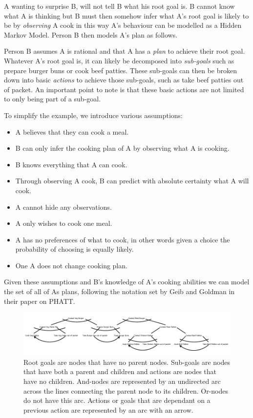\documentclass[parskip]{cs4rep}
\begin{document}
A wanting to surprise B, will not tell B what his root goal is. B cannot know what A is thinking but B must then somehow infer what A's root goal is likely to be by \textit{observing} A cook in this way A's behaviour can be modelled as a Hidden Markov Model. Person B then models A's plan as follows. 

Person B assumes A is rational and that A has a \textit{plan} to achieve their root goal. Whatever A's root goal is, it can likely be decomposed into \textit{sub-goals} such as prepare burger buns or cook beef patties. These sub-goals can then be broken down into basic \textit{actions} to achieve those sub-goals, such as take beef patties out of packet. An important point to note is that these basic actions are not limited to only being part of a sub-goal.

To simplify the example, we introduce various assumptions:

\begin{itemize}
\item
A believes that they can cook a meal.
\item
B can only infer the cooking plan of A by observing what A is cooking.
\item
B knows everything that A can cook.
\item
Through observing A cook, B can predict with absolute certainty what A will cook.
\item
A cannot hide any observations.
\item
A only wishes to cook one meal.
\item
A has no preferences of what to cook, in other words given a choice the probability of choosing is equally likely.
\item
One A does not change cooking plan.
\end{itemize}

Given these assumptions and B's knowledge of A's cooking abilities we can model the set of all of As plans, following the notation set by Geib and Goldman in their paper on PHATT.

\begin{figure}[h]
\centering
\includegraphics{images/example-plan-recognition}
\caption{Root goals are nodes that have no parent nodes. Sub-goals are nodes that have both a parent and children and actions are nodes that have no children. And-nodes are represented by an undirected arc across the lines connecting the parent node to its children. Or-nodes do not have this arc. Actions or goals that are dependant on a previous action are represented by an arc with an arrow.}
\label{fig:example-plan-library}
\end{figure} 
\end{document}
